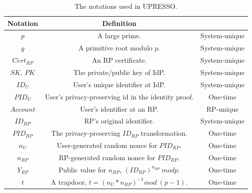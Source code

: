 \begin{table}[tb]
    \caption{The notations used in UPRESSO.}
    \centering
    \begin{tabular}{|c|c|c|}
    \hline
    {Notation} & {Definition} & {} \\
    \hline
    {$p$} & {A large prime.} & {System-unique} \\
    \hline
    {$g$} & {A primitive root  modulo $p$. } & {System-unique} \\
    \hline
    {$Cert_{RP}$} & {An RP certificate. } & {System-unique} \\
    \hline
    {$SK$, $PK$} & {The private/public key of IdP. } & {System-unique} \\
    \hline
    {$ID_U$} & {User's unique identifier at IdP.} & {System-unique} \\
    \hline
    {$PID_U$} & {User's privacy-preserving id in the identity proof.} & {One-time}\\
    \hline
    {$Account$} & {User's identifier at an RP.} & {RP-unique} \\
    \hline
    {$ID_{RP}$} & {RP's original identifier.} & {System-unique} \\
    \hline
    {$PID_{RP}$} & {The privacy-preserving $ID_{RP}$ transformation.} & {One-time} \\
    \hline
    {$n_U$} & {User-generated random nonce for $PID_{RP}$.} & {One-time} \\
    \hline
    {$n_{RP}$} & {RP-generated random nonce for $PID_{RP}$.} & {One-time} \\
    \hline
    {$Y_{RP}$} & {Public value for $n_{RP}$, $(ID_{RP})^{n_{RP}} \ mod p$.} & {One-time} \\
    \hline
    {$t$} & {A trapdoor, $t=(n_U*n_{RP})^{-1} mod \ (p-1)$.} & {One-time} \\
    \hline
    \end{tabular}
    \label{tbl:notations}
\end{table}

